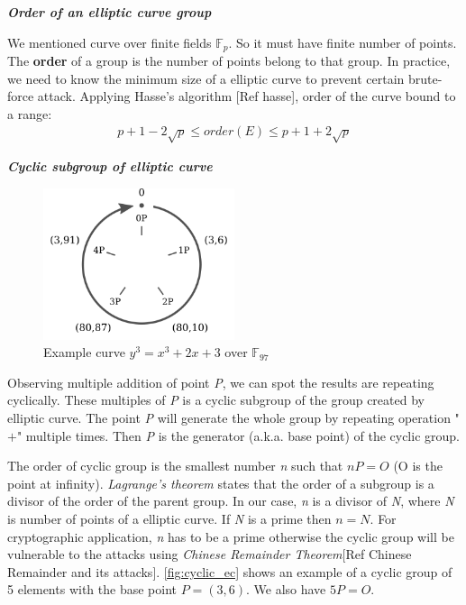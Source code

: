 \bigskip
{\textit {\textbf{Order of an elliptic curve group}}}

We mentioned curve over finite fields $\mathbb{F}_{p}$. So it must have finite number of points.
The {\bf order} of a group is the number of points belong to that group.
In practice, we need to know the minimum size of a elliptic curve to prevent certain brute-force attack.
Applying Hasse's algorithm [Ref hasse], order of the curve bound to a range:\medskip
\begin{align*}
	p + 1 - 2\sqrt{p} \leq order(E) \leq p + 1 + 2\sqrt{p}
\end{align*}

\bigskip
{\textit {\textbf{Cyclic subgroup of elliptic curve}}}
\begin{figure}[h!]
	\centering
	\includegraphics[width=0.5\textwidth]{images/cyclic_ec.png}
	\caption[Example curve $y^3=x^3+2x+3$]{Example curve $y^3=x^3+2x+3$ over $\mathbb{F}_{97}$}
	\label{fig:cyclic_ec}
\end{figure}

Observing multiple addition of point \emph{P}, we can spot the results are repeating cyclically.
These multiples of \emph{P} is a cyclic subgroup of the group created by elliptic curve.
The point \emph{P} will generate the whole group by repeating operation "$+$" multiple times.
Then \emph{P} is the generator (a.k.a. base point) of the cyclic group.

The order of cyclic group is the smallest number \emph{n} such that $nP = O$ (O is the point at infinity).
\emph{Lagrange's theorem} states that the order of a subgroup is a divisor of the order of the parent group.
In our case, \emph{n} is a divisor of \emph{N}, where \emph{N} is number of points of a elliptic curve.
If \emph{N} is a prime then $n = N$. 
For cryptographic application, \emph{n} has to be a prime otherwise the cyclic group will be vulnerable to the attacks using \emph{Chinese Remainder Theorem}[Ref Chinese Remainder and its attacks].
\autoref{fig:cyclic_ec} shows an example of a cyclic group of 5 elements with the base point $P = (3,6)$. 
We also have $5P = O$.


